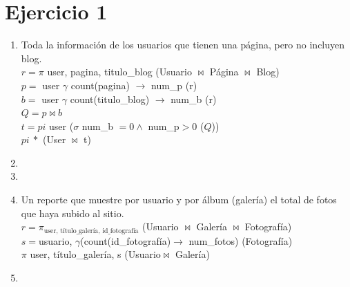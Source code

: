 \documentclass[a4paper, 12pt]{report}
\begin{document}
\section*{Ejercicio 1}{
\begin{enumerate}[label=\alph*)]
\item{Toda la información de los usuarios que tienen una página, pero no
        incluyen blog.\\
    $r = \pi$ user,  pagina, titulo\_blog (Usuario $\Join$ Página $\Join$ Blog)\\
    $p = $ user $\gamma$ count(pagina) $\rightarrow$ num\_p (r)\\
    $b = $ user $\gamma$ count(titulo\_blog) $\rightarrow$ num\_b (r)\\
    $Q = p \Join b$\\
    $t =pi$ user ($\sigma$ num\_b $= 0 \wedge$ num\_p$ > 0$ ($Q$))\\
    $pi\ *$ (User $\Join$ t)
    }
\item{}
\item{}
\item{Un reporte que muestre por usuario y por álbum (galería) el total de fotos
        que haya subido al sitio.\\
    $r = \pi_{\text{user, título\_galería, id\_fotografía}}$ (Usuario $\Join$ Galería
        $\Join$ Fotografía)\\
    $s =$usuario,  $\gamma$(count(id\_fotografía)$\rightarrow$ num\_fotos) (Fotografía)\\
    $\pi $ user, título\_galería, s (Usuario$\Join$ Galería)
}
\item{}
\end{enumerate}
}
\end{document}
